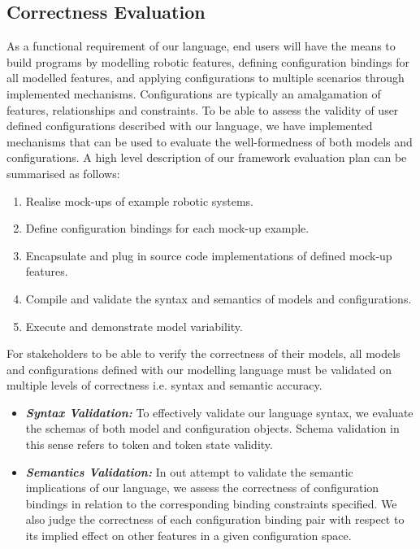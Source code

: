 \documentclass[conference]{IEEEtran}
\begin{document}
\subsection{Correctness Evaluation}
As a functional requirement of our language, end users will have the means to build programs by modelling robotic features, defining configuration bindings for all modelled features, and applying configurations to multiple scenarios through implemented mechanisms. Configurations are typically an amalgamation of features, relationships and constraints. To be able to assess the validity of user defined configurations described with our language, we have implemented mechanisms that can be used to evaluate the well-formedness of both models and configurations. A high level description of our framework evaluation plan can be summarised as follows:
\begin{enumerate}
  \item Realise mock-ups of example robotic systems.
  \item Define configuration bindings for each mock-up example.
  \item Encapsulate and plug in source code implementations of defined mock-up features.
  \item Compile and validate the syntax and semantics of models and configurations.
  \item Execute and demonstrate model variability.
\end{enumerate}
For stakeholders to be able to verify the correctness of their models, all models and configurations defined with our modelling language must be validated on multiple levels of correctness i.e. syntax and semantic accuracy. 
\begin{itemize}[label={}]
  \item \textit{\textbf{Syntax Validation:}} To effectively validate our language syntax, we evaluate the schemas of both model and configuration objects. Schema validation in this sense refers to token and token state validity.
 
  \item \textit{\textbf{Semantics Validation:}} In out attempt to validate the semantic implications of our language, we assess the correctness of configuration bindings in relation to the corresponding binding constraints specified. We also judge the correctness of each configuration binding pair with respect to its implied effect on other features in a given configuration space.
  
\end{itemize}
\end{document}
